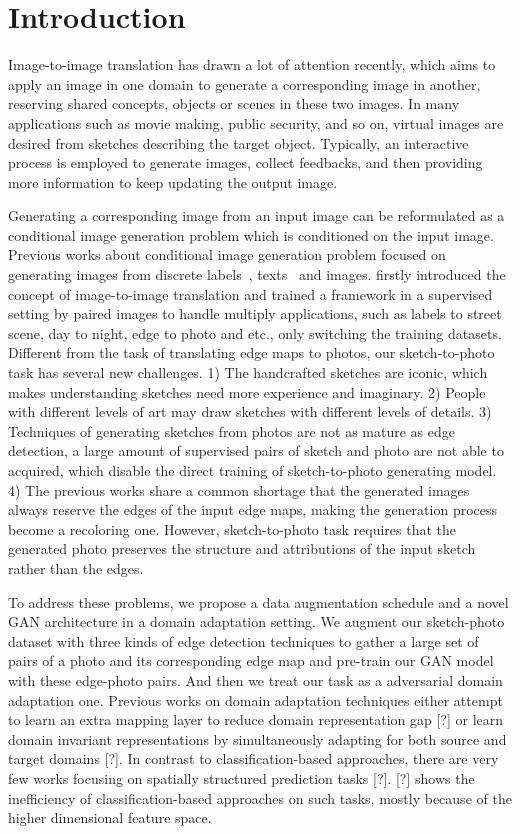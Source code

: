\section{Introduction}
Image-to-image translation has drawn a lot of attention recently, which aims to apply an image in one domain to generate a corresponding image in another, reserving shared concepts, objects or scenes in these two images. In many applications such as movie making, public security, and so on, virtual images are desired from sketches describing the target object. Typically, an interactive process is employed to generate images, collect feedbacks, and then providing more information to keep updating the output image.

Generating a corresponding image from an input image can be reformulated as a conditional image generation problem which is conditioned on the input image. Previous works about conditional image generation problem focused on generating images from discrete labels~\cite{CGAN}, texts~\cite{Reed2016} and images.
\cite{pix2pix} firstly introduced the concept of image-to-image translation and trained a framework in a supervised setting by paired images to handle multiply applications, such as labels to street scene, day to night, edge to photo and etc., only switching the training datasets.
Different from the task of translating edge maps to photos, our sketch-to-photo task has several new challenges. 
1) The handcrafted sketches are iconic, which makes understanding sketches need more experience and imaginary. 
2) People with different levels of art may draw sketches with different levels of details. 
3) Techniques of generating sketches from photos are not as mature as edge detection, a large amount of supervised pairs of sketch and photo are not able to acquired, which disable the direct training of sketch-to-photo generating model.
4) The previous works share a common shortage that the generated images always reserve the edges of the input edge maps, making the generation process become a recoloring one. However, sketch-to-photo task requires that the generated photo preserves the structure and attributions of the input sketch rather than the edges.

To address these problems, we propose a data augmentation schedule and a novel GAN architecture in a domain adaptation setting. 
We augment our sketch-photo dataset with three kinds of edge detection techniques to gather a large set of pairs of a photo and its corresponding edge map and pre-train our GAN model with these edge-photo pairs. And then we treat our task as a adversarial domain adaptation one.
Previous works on domain adaptation techniques either attempt to learn an extra mapping layer to reduce domain representation gap [?] or learn domain invariant representations by simultaneously adapting for both source and target domains [?]. In contrast to classification-based approaches, there are very few works focusing on spatially structured prediction tasks [?]. [?] shows the inefficiency of classification-based approaches on such tasks, mostly because of the higher dimensional feature space. 


